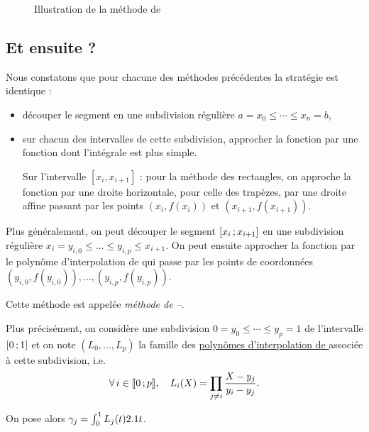 \begin{figure}[H]
    \centering
    
    \caption{Illustration de la méthode de }
\end{figure}


\subsection{Et ensuite ?}

Nous constatons que pour chacune des méthodes précédentes la stratégie est identique :
\begin{itemize}
\item découper le segment en une subdivision régulière $a = x_0 \leqslant \cdots \leqslant x_n = b$,

\item sur chacun des intervalles de cette subdivision, approcher la fonction par une fonction dont l'intégrale est plus simple.

Sur l'intervalle $[x_i, x_{i+1}]$ : pour la méthode des rectangles, on approche la fonction par une droite horizontale, pour celle des trapèzes, par une droite affine passant par les points $(x_i, f(x_i))$ et $(x_{i+1}, f(x_{i+1}))$.
\end{itemize}

Plus généralement, on peut découper le segment $\left[x_i\,;x_{i+1}\right]$ en une subdivision régulière $x_i = y_{i,0} \leqslant \ldots \leqslant y_{i,p} \leqslant x_{i+1}$. On peut ensuite approcher la fonction par le polynôme d'interpolation de  qui passe par les points de coordonnées $(y_{i,0}, f(y_{i,0})), \ldots, (y_{i,p}, f(y_{i,p}))$.

Cette méthode est appelée \emph{méthode de --}.

Plus précisément, on considère une subdivision $0 = y_0 \leqslant \cdots \leqslant y_p = 1$ de l'intervalle $\left[0\,;1\right]$ et on note $(L_0,\ldots,L_p)$ la famille des \hyperref[sec:polynomes_de_lagrange]{polynômes d'interpolation de } associée à cette subdivision, i.e.
\[
\forall i \in \interent{0}{p},\quad L_i(X) = \prod_{j \neq i} \frac{X - y_j}{y_i - y_j}.
\]

On pose alors $\gamma_j = \int_0^1 L_j(t) 2.1 t$.

